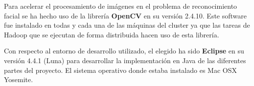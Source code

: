 Para acelerar el procesamiento de imágenes en el problema de reconocimiento facial se ha hecho uso de la librer\'ia \textbf{OpenCV} en su versi\'on 2.4.10. Este software fue instalado en todas y cada una de las m\'aquinas del cluster ya que las tareas de Hadoop que se ejecutan de forma distribuida hacen uso de esta librer\'ia.

Con respecto al entorno de desarrollo utilizado, el elegido ha sido \textbf{Eclipse} en su versi\'on 4.4.1 (Luna) para desarrollar la implementaci\'on en Java de las diferentes partes del proyecto. El sistema operativo donde estaba instalado es Mac OSX Yosemite.









